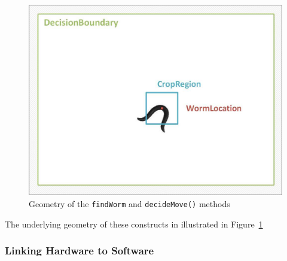 \documentclass[main.tex]{subfiles}
\begin{document}
\begin{figure}[!htbp]
  \centering
  \includegraphics[scale = 0.5]{geom}
  \caption{Geometry of the \texttt{findWorm} and \texttt{decideMove()} methods}
  \label{fig:geom}
\end{figure}


The underlying geometry of these constructs in illustrated in Figure~\ref{fig:geom}

\subsubsection{Linking Hardware to Software}
\label{sss:hslink}
\end{document}
